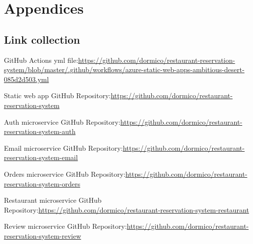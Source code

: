 \appendix
\chapter*{Appendices}
\setcounter{chapter}{1}  %
\setcounter{equation}{0} %

\section{Link collection}\label{links}

GitHub Actions yml file:\newline \url{https://github.com/dormico/restaurant-reservation-system/blob/master/.github/workflows/azure-static-web-apps-ambitious-desert-085d2d503.yml}\label{GitHubActionsYml}

Static web app GitHub Repository:\newline \url{https://github.com/dormico/restaurant-reservation-system}\label{GitHubRepo}

Auth microservice GitHub Repository:\newline \url{https://github.com/dormico/restaurant-reservation-system-auth}\label{GitHubRepoAuth}

Email microservice GitHub Repository:\newline \url{https://github.com/dormico/restaurant-reservation-system-email}\label{GitHubRepoEmail}

Orders microservice GitHub Repository:\newline \url{https://github.com/dormico/restaurant-reservation-system-orders}\label{GitHubRepoOrder}

Restaurant microservice GitHub Repository:\newline \url{https://github.com/dormico/restaurant-reservation-system-restaurant}\label{GitHubRepoRestaurant}

Review microservice GitHub Repository:\newline \url{https://github.com/dormico/restaurant-reservation-system-review}\label{GitHubRepoReview}

